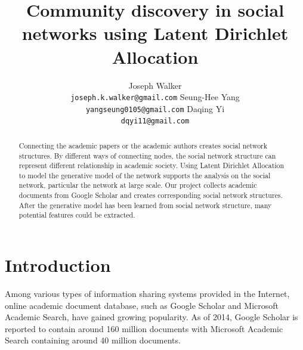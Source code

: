 \documentclass[letterpaper]{article}
\begin{document}
%
\title{Community discovery in social networks using Latent Dirichlet Allocation}

\author{ 
	Joseph Walker 
	\\ \texttt{joseph.k.walker@gmail.com}
	\And Seung-Hee Yang 
	\\ \texttt{yangseung0105@gmail.com}
	\And Daqing Yi 
	\\ \texttt{dqyi11@gmail.com}
}
\maketitle

\begin{abstract}
Connecting the academic papers or the academic authors creates social network structures.
By different ways of connecting nodes, the social network structure can represent different relationship in academic society.
Using Latent Dirichlet Allocation to model the generative model of the network supports the analysis on the social network,
particular the network at large scale.
Our project collects academic documents from Google Scholar and creates corresponding social network structures.
After the generative model has been learned from social network structure,
many potential features could be extracted.

\end{abstract}

\section{Introduction}

Among various types of information sharing systems provided in the Internet, online academic document database, such as Google Scholar and Microsoft Academic Search, have gained growing popularity.
As of 2014, Google Scholar is reported to contain around 160 million documents with Microsoft Academic Search containing around 40 million documents. 
\end{document}
